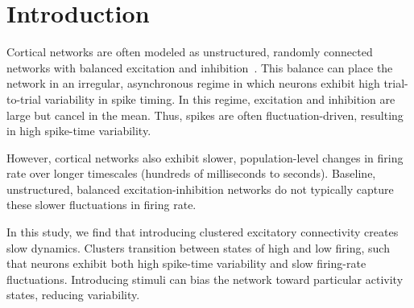 \section{Introduction}
\label{sec:introduction}

Cortical networks are often modeled as unstructured, randomly
connected networks with balanced excitation and inhibition~\citep{vanvreeswijk1996chaos, brunel2000dynamics}. This balance can
place the network in an irregular, asynchronous regime in which neurons
exhibit high trial-to-trial variability in spike timing. In this regime,
excitation and inhibition are large but cancel in the mean. Thus, spikes are
often fluctuation-driven, resulting in high spike-time variability.

However, cortical networks also exhibit slower, population-level changes in
firing rate over longer timescales (hundreds of milliseconds to seconds).
Baseline, unstructured, balanced excitation-inhibition networks do not
typically capture these slower fluctuations in firing rate.

In this study, we find that introducing clustered excitatory connectivity
creates slow dynamics. Clusters transition between states of high and low
firing, such that neurons exhibit both high spike-time variability and slow
firing-rate fluctuations. Introducing stimuli can bias the network toward
particular activity states, reducing variability.